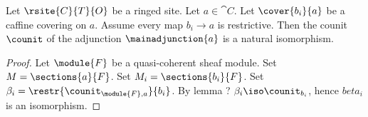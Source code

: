 \begin{lemma}
Let $\rsite{C}{T}{O}$ be a ringed site.
Let $a \in \cat{C}$.
Let $\cover{b_i}{a}$ be a caffine covering on $a$.
Assume every map $b_i \rightarrow a$ is restrictive.
Then the counit $\counit$ of the adjunction $\mainadjunction{a}$
is a natural isomorphism.
\end{lemma}


\begin{proof}
Let $\module{F}$ be a quasi-coherent sheaf module. 
Set $M = \sections{a}{F}$.
Set $M_i = \sections{b_i}{F}$.
Set $\beta_i = \restr{\counit_{\module{F},a}}{b_i}$.
By lemma ? $\beta_i \iso \counit_{b_i}$, hence $beta_i$ is an isomorphism.











\end{proof}
